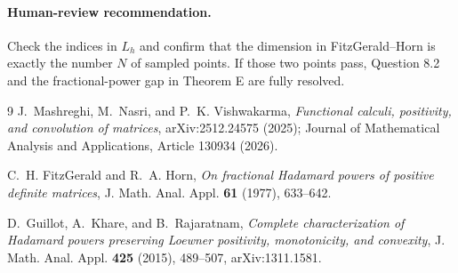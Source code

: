 \documentclass[11pt]{article}
\begin{document}
\paragraph{Human-review recommendation.}
Check the indices in $L_h$ and confirm that the dimension in
FitzGerald--Horn is exactly the number $N$ of sampled points. If those two
points pass, Question 8.2 and the fractional-power gap in Theorem E are fully
resolved.

\begin{thebibliography}{9}
J.~Mashreghi, M.~Nasri, and P.~K. Vishwakarma,
\emph{Functional calculi, positivity, and convolution of matrices},
arXiv:2512.24575 (2025); Journal of Mathematical Analysis and Applications,
Article 130934 (2026).

C.~H. FitzGerald and R.~A. Horn,
\emph{On fractional Hadamard powers of positive definite matrices},
J. Math. Anal. Appl. \textbf{61} (1977), 633--642.

D.~Guillot, A.~Khare, and B.~Rajaratnam,
\emph{Complete characterization of Hadamard powers preserving Loewner
positivity, monotonicity, and convexity},
J. Math. Anal. Appl. \textbf{425} (2015), 489--507,
arXiv:1311.1581.
\end{thebibliography}
\end{document}
